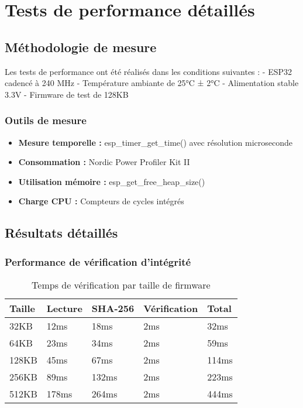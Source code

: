 \chapter{Tests de performance détaillés}
\label{app:performance}

\section{Méthodologie de mesure}

Les tests de performance ont été réalisés dans les conditions suivantes :
- ESP32 cadencé à 240 MHz
- Température ambiante de 25°C ± 2°C
- Alimentation stable 3.3V
- Firmware de test de 128KB

\subsection{Outils de mesure}

\begin{itemize}
    \item \textbf{Mesure temporelle :} esp\_timer\_get\_time() avec résolution microseconde
    \item \textbf{Consommation :} Nordic Power Profiler Kit II
    \item \textbf{Utilisation mémoire :} esp\_get\_free\_heap\_size()
    \item \textbf{Charge CPU :} Compteurs de cycles intégrés
\end{itemize}

\section{Résultats détaillés}

\subsection{Performance de vérification d'intégrité}

\begin{table}[h!]
\centering
\caption{Temps de vérification par taille de firmware}
\begin{tabular}{@{}lllll@{}}
\toprule
\textbf{Taille} & \textbf{Lecture} & \textbf{SHA-256} & \textbf{Vérification} & \textbf{Total} \\
\midrule
32KB  & 12ms & 18ms & 2ms & 32ms \\
64KB  & 23ms & 34ms & 2ms & 59ms \\
128KB & 45ms & 67ms & 2ms & 114ms \\
256KB & 89ms & 132ms & 2ms & 223ms \\
512KB & 178ms & 264ms & 2ms & 444ms \\
\bottomrule
\end{tabular}
\end{table}

